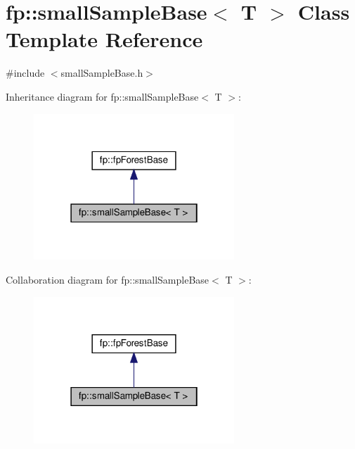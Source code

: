 \hypertarget{classfp_1_1smallSampleBase}{}\section{fp\+:\+:small\+Sample\+Base$<$ T $>$ Class Template Reference}
\label{classfp_1_1smallSampleBase}


{\ttfamily \#include $<$small\+Sample\+Base.\+h$>$}



Inheritance diagram for fp\+:\+:small\+Sample\+Base$<$ T $>$\+:\nopagebreak
\begin{figure}[H]
\begin{center}
\leavevmode
\includegraphics[width=214pt]{classfp_1_1smallSampleBase__inherit__graph}
\end{center}
\end{figure}


Collaboration diagram for fp\+:\+:small\+Sample\+Base$<$ T $>$\+:\nopagebreak
\begin{figure}[H]
\begin{center}
\leavevmode
\includegraphics[width=214pt]{classfp_1_1smallSampleBase__coll__graph}
\end{center}
\end{figure}
